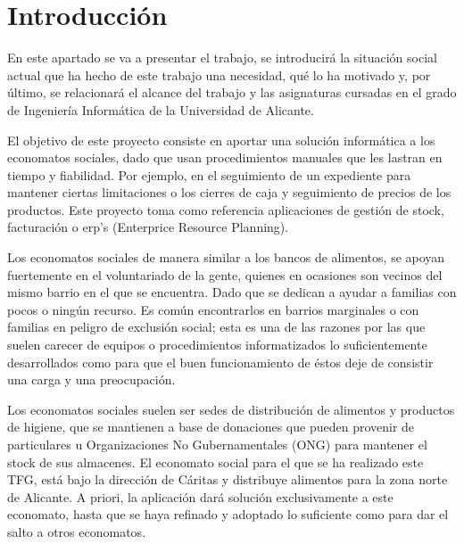 
\chapter{Introducción}
En este apartado se va a presentar el trabajo, se introducirá la situación social actual que ha hecho de este trabajo una necesidad, qué lo ha motivado y, por último, se relacionará el alcance del trabajo y las asignaturas cursadas en el grado de Ingeniería Informática de la Universidad de Alicante.
\par El objetivo de este proyecto consiste en aportar una solución informática a los economatos sociales, dado que usan procedimientos manuales que les lastran en tiempo y fiabilidad. Por ejemplo, en el seguimiento de un expediente para mantener ciertas limitaciones o los cierres de caja y seguimiento de precios de los productos. Este proyecto toma como referencia aplicaciones de gestión de stock, facturación o erp's (Enterprice Resource Planning).
\par Los economatos sociales de manera similar a los bancos de alimentos, se apoyan fuertemente en el voluntariado de la gente, quienes en ocasiones son vecinos del mismo barrio en el que se encuentra. Dado que se dedican a ayudar a familias con pocos o ningún recurso. Es común encontrarlos en barrios marginales o con familias en peligro de exclusión social; esta es una de las razones por las que suelen carecer de equipos o procedimientos informatizados lo suficientemente desarrollados como para que el buen funcionamiento de éstos deje de consistir una carga y una preocupación.
\par Los economatos sociales suelen ser sedes de distribución de alimentos y productos de higiene, que se mantienen a base de donaciones que pueden provenir de particulares u Organizaciones No Gubernamentales (ONG) para mantener el stock de sus almacenes. El economato social para el que se ha realizado este TFG, está bajo la dirección de Cáritas y distribuye alimentos para la zona norte de Alicante. A priori, la aplicación dará solución exclusivamente a este economato, hasta que se haya refinado y adoptado lo suficiente como para dar el salto a otros economatos.
